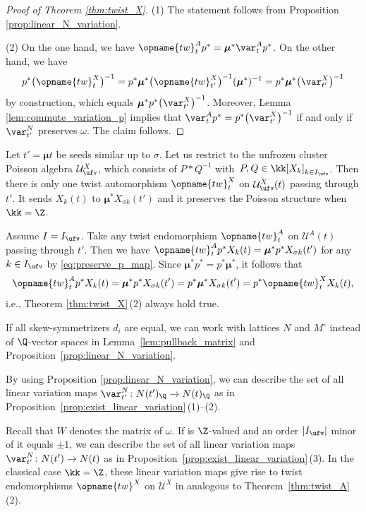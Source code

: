 \documentclass[pdftex]{sigma}
\renewcommand{\tw}{\opname{tw}}
\newcommand{\Mc}{M^\circ}
\newcommand{\Iufv}{I_{\ufv}}
\newcommand{\upClAlg}{\mathcal{U}^A}
\newcommand{\XClAlg}{\mathcal{U}^X}
\newcommand{\seq}{\boldsymbol{\mu}}%
\renewcommand{\tw}{\opname{tw}}
\newcommand{\low}{\opname{\fv,\ufv}}
\numberwithin{equation}{section}
\begin{document}
\begin{proof}[Proof of Theorem \ref{thm:twist_X}]

(1) The statement follows from Proposition \ref{prop:linear_N_variation}.

(2) On the one hand, we have $\tw_{t}^{A}p^{*}=\seq^{*}\var_{t}^{A}p^{*}$.
On the other hand, we have \[p^{*}\bigl(\tw_{t}^{X}\bigr)^{-1}=p^{*}\seq^{*}\bigl(\tw_{t'}^{X}\bigr)^{-1}(\seq^{*})^{-1}=p^{*}\seq^{*}\bigl(\var_{t'}^{X}\bigr)^{-1}\]
by construction, which equals $\seq^{*}p^{*}\bigl(\var_{t'}^{X}\bigr)^{-1}$.
Moreover, Lemma \ref{lem:commute_variation_p} implies that $\var_{t}^{A}p^{*}=\allowbreak\smash{p^{*}\bigl(\var_{t'}^{X}\bigr)^{-1}}$
if and only if $\var_{t'}^{N}$ preserves $\omega$. The claim follows.
\end{proof}

\begin{Remark}
Let $t'=\seq t$ be seeds similar up to $\sigma$. Let us restrict
to the unfrozen cluster Poisson algebra $\XClAlg_{\ufv}$, which consists of $P*Q^{-1}$ with~$P,Q\in \kk[X_k]_{k\in \Iufv}$. Then there is only one twist automorphism $\tw_{t}^{X}$ on $\XClAlg_{\ufv}(t)$
passing through $t'$. It sends $X_{k}(t)$ to $\seq^{*}X_{\sigma k}(t')$
and it preserves the Poisson structure when $\kk=\Z$.

Assume $I=\Iufv$. Take any twist endomorphism $\tw_{t}^{A}$ on $\upClAlg(t)$
passing through $t'$. Then we have $\tw_{t}^{A}p^{*}X_{k}(t)=\seq^{*}p^{*}X_{\sigma k}(t')$
for any $k\in I_{\ufv}$ by \eqref{eq:preserve_p_map}. Since $\seq^{*}p^{*}=p^{*}\seq^{*}$,
it follows that \[\tw_{t}^{A}p^{*}X_{k}(t)=\seq^{*}p^{*}X_{\sigma k}(t')=p^{*}\seq^{*}X_{\sigma k}(t')=p^{*}\tw_{t}^{X}X_{k}(t),\]
i.e., Theorem \ref{thm:twist_X}\,(2) always hold true.
\end{Remark}

\begin{Remark}[{existence of $\tw^X$}]\label{rem:exist_X_twist}
If all skew-symmetrizers $d_{i}$ are equal, we can work with lattices
$N$ and $\Mc$ instead of $\Q$-vector spaces in Lemma~\ref{lem:pullback_matrix}
and Proposition~\ref{prop:linear_N_variation}.

By using Proposition \ref{prop:linear_N_variation}, we can describe
the set of all linear variation maps $\var_{t'}^{N}\colon N(t')_{\Q}\rightarrow N(t)_{\Q}$
as in Proposition~\ref{prop:exist_linear_variation}\,(1)--(2).

Recall that $W$ denotes the matrix of $\omega$. If \smash{$\left(\begin{smallmatrix}
W_{\ufv}\\
W_{\low}
\end{smallmatrix}\right)$} is $\Z$-valued and an order $|I_{\ufv}|$ minor of it equals $\pm1$,
we can describe the set of all linear variation maps $\var_{t'}^{N}\colon N(t')\rightarrow N(t)$
as in Proposition~\ref{prop:exist_linear_variation}\,(3). In the classical case $\kk=\Z$, these linear variation
maps give rise to twist endomorphisms $\tw^{X}$ on $\XClAlg$ in
analogous to Theorem~\ref{thm:twist_A}\,(2).
\end{Remark}
\end{document}
